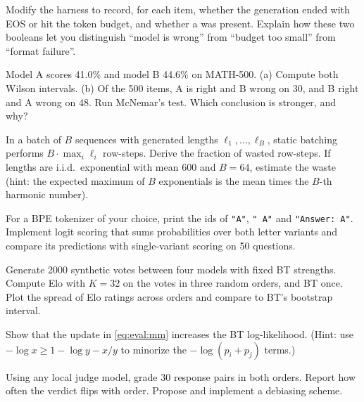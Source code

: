 \begin{exercise}
Modify the harness to record, for each item, whether the generation ended with EOS or hit the
token budget, and whether a \bx{} was present. Explain how these two booleans let you distinguish
``model is wrong'' from ``budget too small'' from ``format failure''.
\end{exercise}

\begin{exercise}
Model A scores 41.0\% and model B 44.6\% on MATH-500. (a) Compute both Wilson intervals. (b) Of
the 500 items, A is right and B wrong on 30, and B right and A wrong on 48. Run McNemar's test.
Which conclusion is stronger, and why?
\end{exercise}

\begin{exercise}
In a batch of $B$ sequences with generated lengths $\ell_1, \dots, \ell_B$, static batching
performs $B \cdot \max_i \ell_i$ row-steps. Derive the fraction of wasted row-steps. If lengths
are i.i.d.\ exponential with mean 600 and $B = 64$, estimate the waste (hint: the expected maximum
of $B$ exponentials is the mean times the $B$-th harmonic number).
\end{exercise}

\begin{exercise}
For a BPE tokenizer of your choice, print the ids of \texttt{"A"}, \texttt{" A"} and
\texttt{"Answer: A"}. Implement logit scoring that sums probabilities over both letter variants and
compare its predictions with single-variant scoring on 50 questions.
\end{exercise}

\begin{exercise}
Generate 2000 synthetic votes between four models with fixed BT strengths. Compute Elo with
$K=32$ on the votes in three random orders, and BT once. Plot the spread of Elo ratings across
orders and compare to BT's bootstrap interval.
\end{exercise}

\begin{exercise}[MM derivation]
Show that the update in \cref{eq:eval:mm} increases the BT log-likelihood. (Hint: use
$-\log x \ge 1 - \log y - x/y$ to minorize the $-\log(p_i + p_j)$ terms.)
\end{exercise}

\begin{exercise}
Using any local judge model, grade 30 response pairs in both orders. Report how often the verdict
flips with order. Propose and implement a debiasing scheme.
\end{exercise}

